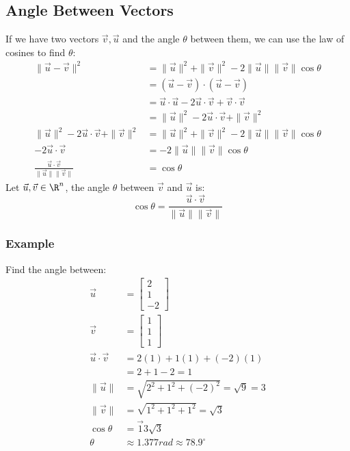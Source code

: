 \documentclass{math}
\begin{document}
\subsection*{Angle Between Vectors}
If we have two vectors \( \vec{v},\vec{u} \) and the angle \( \theta \) between
them, we can use the law of cosines to find \( \theta \):
\begin{align*}
  \|\vec{u}-\vec{v}\|^2 &=
    \|\vec{u}\|^2+\|\vec{v}\|^2-2\|\vec{u}\|\|\vec{v}\|\cos\theta \\
  &= (\vec{u}-\vec{v})\cdot(\vec{u}-\vec{v}) \\
  &= \vec{u}\cdot\vec{u}-2\vec{u}\cdot\vec{v}+\vec{v}\cdot\vec{v} \\
  &= \|\vec{u}\|^2-2\vec{u}\cdot\vec{v}+\|\vec{v}\|^2 \\
  \|\vec{u}\|^2-2\vec{u}\cdot\vec{v}+\|\vec{v}\|^2 &=
    \|\vec{u}\|^2+\|\vec{v}\|^2-2\|\vec{u}\|\|\vec{v}\|\cos\theta \\
  -2\vec{u}\cdot\vec{v} &= -2\|\vec{u}\|\|\vec{v}\|\cos\theta \\
  \frac{\vec{u}\cdot\vec{v}}{\|\vec{u}\|\|\vec{v}\|} &= \cos\theta
\end{align*}
Let \( \vec{u},\vec{v}\in\R^n \), the angle \( \theta \) between \( \vec{v} \)
and \( \vec{u} \) is:
\[ \cos\theta = \frac{\vec{u}\cdot\vec{v}}{\|\vec{u}\|\|\vec{v}\|} \]

\subsubsection*{Example}
Find the angle between:
\begin{align*}
  \vec{u} &= \begin{bmatrix}2 \\ 1 \\ -2\end{bmatrix} \\
  \vec{v} &= \begin{bmatrix}1 \\ 1 \\ 1\end{bmatrix} \\
  \vec{u}\cdot\vec{v} &= 2(1)+1(1)+(-2)(1) \\
  &= 2+1-2 = 1 \\
  \|\vec{u}\| &= \sqrt{2^2+1^2+(-2)^2} = \sqrt{9} = 3 \\
  \|\vec{v}\| &= \sqrt{1^2+1^2+1^2} = \sqrt{3} \\
  \cos\theta &= \vec{1}{3\sqrt{3}} \\
  \theta &\approx 1.377rad \approx 78.9^\circ
\end{align*}
\end{document}
